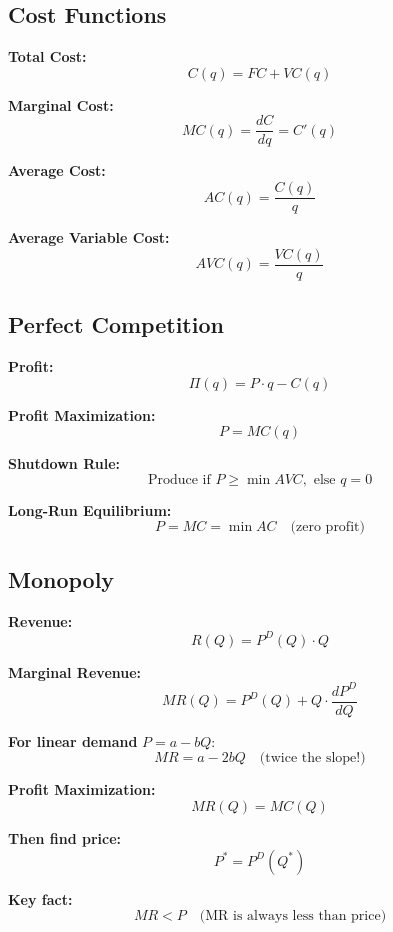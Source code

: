 \documentclass[10pt,letterpaper]{article}
\begin{document}
\subsection{Cost Functions}

\begin{tcolorbox}[colback=formulacolor!5,colframe=formulacolor,title={\textbf{Costs}}]
\textbf{Total Cost:}
\[
C(q) = FC + VC(q)
\]

\textbf{Marginal Cost:}
\[
MC(q) = \frac{dC}{dq} = C'(q)
\]

\textbf{Average Cost:}
\[
AC(q) = \frac{C(q)}{q}
\]

\textbf{Average Variable Cost:}
\[
AVC(q) = \frac{VC(q)}{q}
\]
\end{tcolorbox}

\subsection{Perfect Competition}

\begin{tcolorbox}[colback=formulacolor!5,colframe=formulacolor,title={\textbf{Competitive Firms}}]
\textbf{Profit:}
\[
\Pi(q) = P \cdot q - C(q)
\]

\textbf{Profit Maximization:}
\[
P = MC(q)
\]

\textbf{Shutdown Rule:}
\[
\text{Produce if } P \geq \min AVC, \text{ else } q = 0
\]

\textbf{Long-Run Equilibrium:}
\[
P = MC = \min AC \quad \text{(zero profit)}
\]
\end{tcolorbox}

\subsection{Monopoly}

\begin{tcolorbox}[colback=yellow!20,colframe=orange!80,title={\textbf{Monopoly - MOST IMPORTANT}}]
\textbf{Revenue:}
\[
R(Q) = P^D(Q) \cdot Q
\]

\textbf{Marginal Revenue:}
\[
MR(Q) = P^D(Q) + Q \cdot \frac{dP^D}{dQ}
\]

\textbf{For linear demand} $P = a - bQ$:
\[
\boxed{MR = a - 2bQ} \quad \text{(twice the slope!)}
\]

\textbf{Profit Maximization:}
\[
MR(Q) = MC(Q)
\]

\textbf{Then find price:}
\[
P^* = P^D(Q^*)
\]

\textbf{Key fact:}
\[
MR < P \quad \text{(MR is always less than price)}
\]
\end{tcolorbox}
\end{document}
